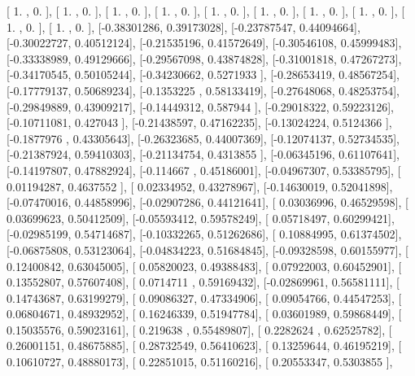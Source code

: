 \documentclass{article}
\begin{document}
       [ 1.        ,  0.        ],
       [ 1.        ,  0.        ],
       [ 1.        ,  0.        ],
       [ 1.        ,  0.        ],
       [ 1.        ,  0.        ],
       [ 1.        ,  0.        ],
       [ 1.        ,  0.        ],
       [ 1.        ,  0.        ],
       [ 1.        ,  0.        ],
       [ 1.        ,  0.        ],
       [-0.38301286,  0.39173028],
       [-0.23787547,  0.44094664],
       [-0.30022727,  0.40512124],
       [-0.21535196,  0.41572649],
       [-0.30546108,  0.45999483],
       [-0.33338989,  0.49129666],
       [-0.29567098,  0.43874828],
       [-0.31001818,  0.47267273],
       [-0.34170545,  0.50105244],
       [-0.34230662,  0.5271933 ],
       [-0.28653419,  0.48567254],
       [-0.17779137,  0.50689234],
       [-0.1353225 ,  0.58133419],
       [-0.27648068,  0.48253754],
       [-0.29849889,  0.43909217],
       [-0.14449312,  0.587944  ],
       [-0.29018322,  0.59223126],
       [-0.10711081,  0.427043  ],
       [-0.21438597,  0.47162235],
       [-0.13024224,  0.5124366 ],
       [-0.1877976 ,  0.43305643],
       [-0.26323685,  0.44007369],
       [-0.12074137,  0.52734535],
       [-0.21387924,  0.59410303],
       [-0.21134754,  0.4313855 ],
       [-0.06345196,  0.61107641],
       [-0.14197807,  0.47882924],
       [-0.114667  ,  0.45186001],
       [-0.04967307,  0.53385795],
       [ 0.01194287,  0.4637552 ],
       [ 0.02334952,  0.43278967],
       [-0.14630019,  0.52041898],
       [-0.07470016,  0.44858996],
       [-0.02907286,  0.44121641],
       [ 0.03036996,  0.46529598],
       [ 0.03699623,  0.50412509],
       [-0.05593412,  0.59578249],
       [ 0.05718497,  0.60299421],
       [-0.02985199,  0.54714687],
       [-0.10332265,  0.51262686],
       [ 0.10884995,  0.61374502],
       [-0.06875808,  0.53123064],
       [-0.04834223,  0.51684845],
       [-0.09328598,  0.60155977],
       [ 0.12400842,  0.63045005],
       [ 0.05820023,  0.49388483],
       [ 0.07922003,  0.60452901],
       [ 0.13552807,  0.57607408],
       [ 0.0714711 ,  0.59169432],
       [-0.02869961,  0.56581111],
       [ 0.14743687,  0.63199279],
       [ 0.09086327,  0.47334906],
       [ 0.09054766,  0.44547253],
       [ 0.06804671,  0.48932952],
       [ 0.16246339,  0.51947784],
       [ 0.03601989,  0.59868449],
       [ 0.15035576,  0.59023161],
       [ 0.219638  ,  0.55489807],
       [ 0.2282624 ,  0.62525782],
       [ 0.26001151,  0.48675885],
       [ 0.28732549,  0.56410623],
       [ 0.13259644,  0.46195219],
       [ 0.10610727,  0.48880173],
       [ 0.22851015,  0.51160216],
       [ 0.20553347,  0.5303855 ],
\end{document}
